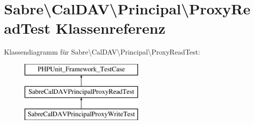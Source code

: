\hypertarget{class_sabre_1_1_cal_d_a_v_1_1_principal_1_1_proxy_read_test}{}\section{Sabre\textbackslash{}Cal\+D\+AV\textbackslash{}Principal\textbackslash{}Proxy\+Read\+Test Klassenreferenz}
\label{class_sabre_1_1_cal_d_a_v_1_1_principal_1_1_proxy_read_test}
Klassendiagramm für Sabre\textbackslash{}Cal\+D\+AV\textbackslash{}Principal\textbackslash{}Proxy\+Read\+Test\+:\begin{figure}[H]
\begin{center}
\leavevmode
\includegraphics[height=3.000000cm]{class_sabre_1_1_cal_d_a_v_1_1_principal_1_1_proxy_read_test}
\end{center}
\end{figure}
